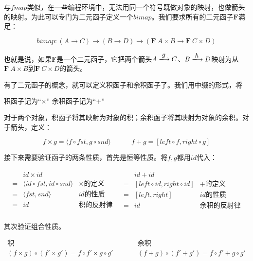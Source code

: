 \documentclass{article}
\begin{document}
与$fmap$类似，在一些编程环境中，无法用同一个符号既做对象的映射，也做箭头的映射。为此可以专门为二元函子定义一个$bimap$。我们要求所有的二元函子$\mathbf{F}$满足：

\[
bimap : (A \to C) \to (B \to D) \to (\mathbf{F}\ A \times B \to \mathbf{F}\ C \times D)
\]

也就是说，如果$\mathbf{F}$是一个二元函子，它把两个箭头$A \arrowto{g} C$、$B \arrowto{h} D$映射为从$\mathbf{F}\ A \times B$到$\mathbf{F}\ C \times D$的箭头。

有了二元函子的概念，就可以定义积函子和余积函子了。我们用中缀的形式，将

\begin{center}
积函子记为“$\times$” \quad \quad \quad 余积函子记为“$+$”
\end{center}

对于两个对象，积函子将其映射为对象的积；余积函子将其映射为对象的余积。对于箭头，定义：

\[
f \times g = \langle f \circ fst, g \circ snd \rangle
\quad \quad \quad
f + g = [left \circ f, right \circ g]
\]

接下来需要验证函子的两条性质，首先是恒等性质。将$f, g$都用$id$代入：

\[
\begin{array}{lr}
  \begin{array}{cll}
    & id \times id & \\
  = & \langle id \circ fst, id \circ snd \rangle & \text{$\times$的定义} \\
  = & \langle fst, snd \rangle & \text{$id$的性质} \\
  = & id & \text{积的反射律} \\
  \end{array}
  &
  \begin{array}{cll}
    & id + id & \\
  = & [ left \circ id, right \circ id ] & \text{$+$的定义} \\
  = & [ left, right] & \text{$id$的性质} \\
  = & id & \text{余积的反射律} \\
  \end{array}
\end{array}
\]

其次验证组合性质。

\[
\begin{array}{ccc}
\text{积} & \quad \quad & \text{余积} \\
 (f \times g) \circ (f' \times g') = f \circ f' \times g \circ g'
 & \quad \quad &
 (f + g) \circ (f' + g') = f \circ f' + g \circ g'
\end{array}
\]
\end{document}
